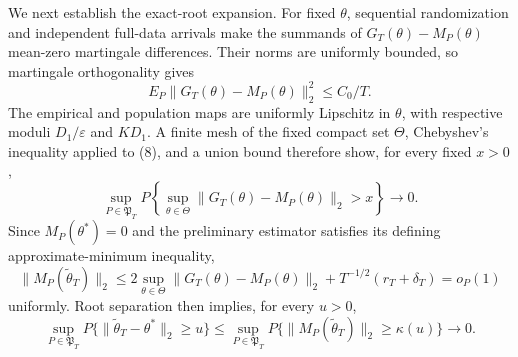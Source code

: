 We next establish the exact-root expansion. For fixed \(\theta\), sequential randomization and independent full-data arrivals make the summands of \(G_T(\theta)-M_P(\theta)\) mean-zero martingale differences. Their norms are uniformly bounded, so martingale orthogonality gives
\[
 E_P\|G_T(\theta)-M_P(\theta)\|_2^2\le C_0/T.
\tag{8}
\]
The empirical and population maps are uniformly Lipschitz in \(\theta\), with respective moduli \(D_1/\varepsilon\) and \(KD_1\). A finite mesh of the fixed compact set \(\Theta\), Chebyshev's inequality applied to (8), and a union bound therefore show, for every fixed \(x>0\),
\[
 \sup_{P\in\mathfrak P_T}P\left\{\sup_{\theta\in\Theta}
 \|G_T(\theta)-M_P(\theta)\|_2>x\right\}\longrightarrow0.
\tag{9}
\]
Since \(M_P(\theta^*)=0\) and the preliminary estimator satisfies its defining approximate-minimum inequality,
\[
 \|M_P(\widetilde\theta_T)\|_2
 \le2\sup_{\theta\in\Theta}\|G_T(\theta)-M_P(\theta)\|_2
 +T^{-1/2}(r_T+\delta_T)=o_P(1)
\tag{10}
\]
uniformly. Root separation then implies, for every \(u>0\),
\[
 \sup_{P\in\mathfrak P_T}P\{\|\widetilde\theta_T-\theta^*\|_2\ge u\}
 \le\sup_{P\in\mathfrak P_T}P\{\|M_P(\widetilde\theta_T)\|_2\ge\kappa(u)\}
 \longrightarrow0.
\tag{11}
\]

